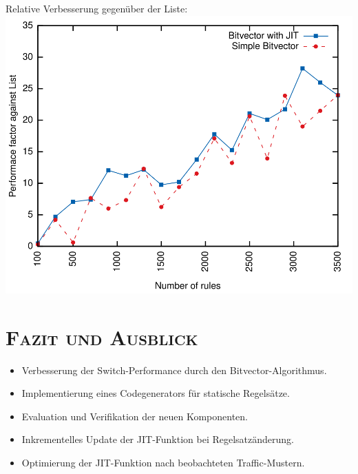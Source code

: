 \documentclass[xcolor=x11names,compress]{beamer}
\renewcommand{\(}{\begin{columns}}
\renewcommand{\)}{\end{columns}}
\newcommand{\<}[1]{\begin{column}{#1}}
\renewcommand{\>}{\end{column}}
\begin{document}
\begin{frame}
  Relative Verbesserung gegenüber der Liste:
  \includegraphics[height=0.9\textheight]{figures/eval_b_relative}
\end{frame}

\section{\scshape Fazit und Ausblick}
\begin{frame}
  \begin{tcolorbox}[colback=yellow!5!white,colframe=yellow!75!black,title=Wichtigste Ergebnisse,drop fuzzy shadow]
    \begin{itemize}
      \item Verbesserung der Switch-Performance durch den Bitvector-Algorithmus.
      \item Implementierung eines Codegenerators für statische Regelsätze.
      \item Evaluation und Verifikation der neuen Komponenten.
    \end{itemize}
  \end{tcolorbox}
  \pause %
  \begin{tcolorbox}[colback=blue!5!white,colframe=blue!75!black,title=Mögliche Anknüpfungspunkte,drop fuzzy shadow]
    \begin{itemize}
      \item Inkrementelles Update der JIT-Funktion bei Regelsatzänderung.
      \item Optimierung der JIT-Funktion nach beobachteten Traffic-Mustern.
    \end{itemize}
  \end{tcolorbox}
\end{frame}
\end{document}
